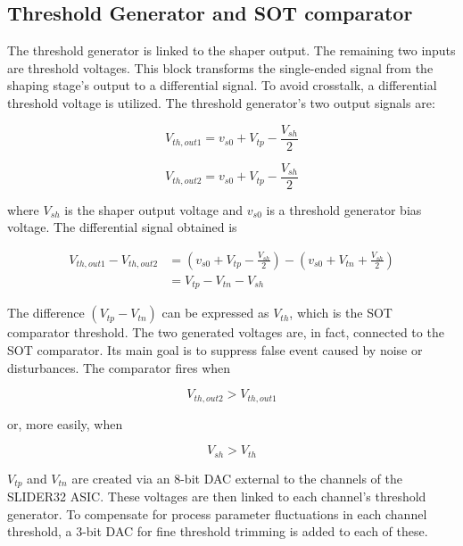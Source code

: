 
\subsection*{Threshold Generator and SOT comparator} \label{thrSOT}
The threshold generator is linked to the shaper output. The remaining two inputs are threshold voltages. This block transforms the single-ended signal from the shaping stage's output to a differential signal. To avoid crosstalk, a differential threshold voltage is utilized. The threshold generator's two output signals are:

\begin{equation}
    V_{th, out1} = v_{s0} + V_{tp} - \frac{V_{sh}}{2}
\end{equation}

\begin{equation}
    V_{th, out2} = v_{s0} + V_{tp} - \frac{V_{sh}}{2}
\end{equation}

\noindent
where $V_{sh}$ is the shaper output voltage and $v_{s0}$ is a threshold generator bias voltage. The differential signal obtained is

\begin{equation}
    \begin{split}
        V_{th, out1} - V_{th, out2} & = (v_{s0} + V_{tp} - \frac{V_{sh}}{2}) - (v_{s0} + V_{tn} + \frac{V_{sh}}{2}) \\
        & = V_{tp} - V_{tn} - V_{sh}
    \end{split}
\end{equation}

The difference $(V_{tp} - V_{tn})$ can be expressed as $V_{th}$, which is the SOT comparator threshold. The two generated voltages are, in fact, connected to the SOT comparator. Its main goal is to suppress false event caused by noise or disturbances. The comparator fires when

\begin{equation}
    V_{th, out2} > V_{th, out1}
\end{equation}

\noindent
or, more easily, when

\begin{equation}
    V_{sh} > V_{th}
\end{equation}

\noindent
$V_{tp}$ and $V_{tn}$ are created via an 8-bit DAC external to the channels of the SLIDER32 ASIC. These voltages are then linked to each channel's threshold generator. To compensate for process parameter fluctuations in each channel threshold, a 3-bit DAC for fine threshold trimming is added to each of these.

